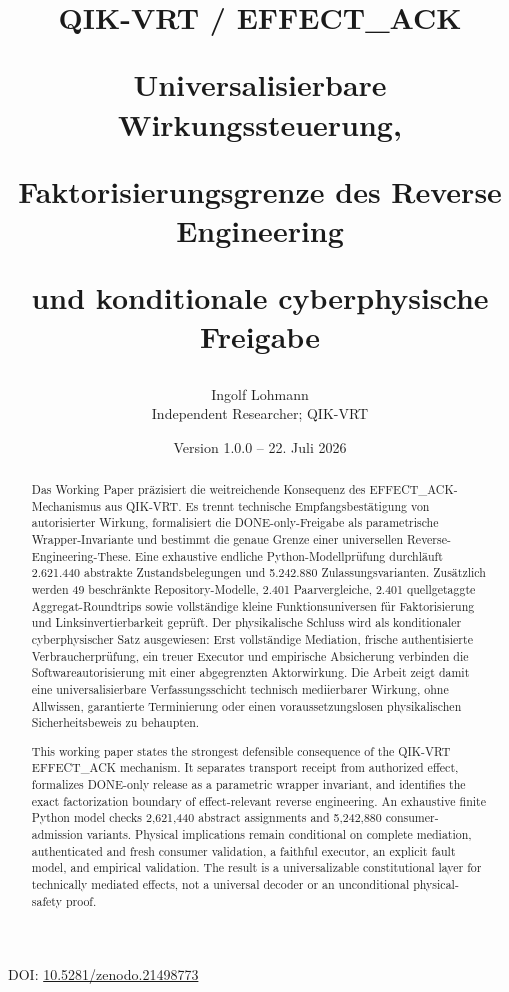 \documentclass[11pt,a4paper]{article}
\title{\vspace{-10mm}\textcolor{qikblue}{\bfseries QIK-VRT / EFFECT\_ACK}\par
\vspace{2mm}\Large Universalisierbare Wirkungssteuerung,\par
Faktorisierungsgrenze des Reverse Engineering\par
und konditionale cyberphysische Freigabe}
\author{Ingolf Lohmann\\\small Independent Researcher; QIK-VRT}
\date{Version 1.0.0 -- 22. Juli 2026}
\begin{document}
\maketitle

\begin{center}
\small DOI: \href{https://doi.org/10.5281/zenodo.21498773}{10.5281/zenodo.21498773}
\end{center}

\begin{center}
\end{center}

\begin{abstract}
Das Working Paper präzisiert die weitreichende Konsequenz des
EFFECT\_ACK-Mechanismus aus QIK-VRT. Es trennt technische Empfangsbestätigung
von autorisierter Wirkung, formalisiert die DONE-only-Freigabe als
parametrische Wrapper-Invariante und bestimmt die genaue Grenze einer
universellen Reverse-Engineering-These. Eine exhaustive endliche
Python-Modellprüfung durchläuft 2.621.440 abstrakte Zustandsbelegungen und
5.242.880 Zulassungsvarianten. Zusätzlich werden 49 beschränkte
Repository-Modelle, 2.401 Paarvergleiche, 2.401 quellgetaggte
Aggregat-Roundtrips sowie vollständige kleine Funktionsuniversen für
Faktorisierung und Linksinvertierbarkeit geprüft. Der physikalische Schluss
wird als konditionaler cyberphysischer Satz ausgewiesen: Erst vollständige
Mediation, frische authentisierte Verbraucherprüfung, ein treuer Executor und
empirische Absicherung verbinden die Softwareautorisierung mit einer
abgegrenzten Aktorwirkung. Die Arbeit zeigt damit eine universalisierbare
Verfassungsschicht technisch mediierbarer Wirkung, ohne Allwissen,
garantierte Terminierung oder einen voraussetzungslosen physikalischen
Sicherheitsbeweis zu behaupten.
\end{abstract}

\begin{abstract}
This working paper states the strongest defensible consequence of the
QIK-VRT EFFECT\_ACK mechanism. It separates transport receipt from authorized
effect, formalizes DONE-only release as a parametric wrapper invariant, and
identifies the exact factorization boundary of effect-relevant reverse
engineering. An exhaustive finite Python model checks 2,621,440 abstract
assignments and 5,242,880 consumer-admission variants. Physical implications
remain conditional on complete mediation, authenticated and fresh consumer
validation, a faithful executor, an explicit fault model, and empirical
validation. The result is a universalizable constitutional layer for
technically mediated effects, not a universal decoder or an unconditional
physical-safety proof.
\end{abstract}
\end{document}
